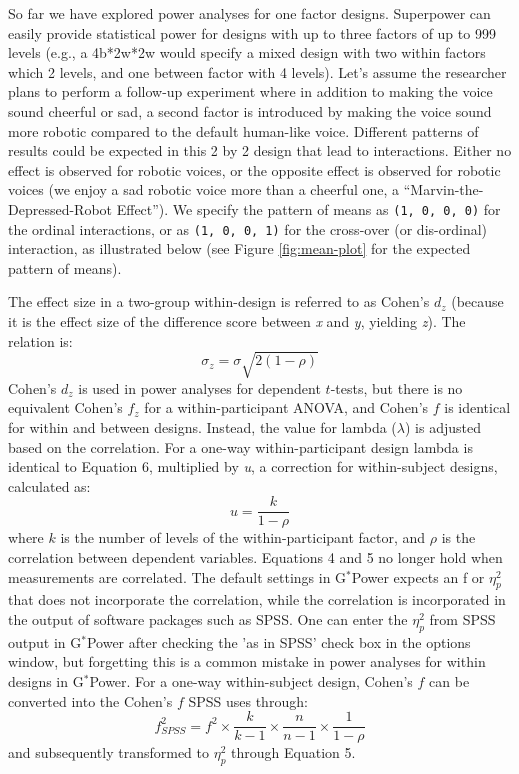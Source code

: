 \documentclass[
  ,jou,floatsintext]{apa6}
\begin{document}
So far we have explored power analyses for one factor designs.
Superpower can easily provide statistical power for designs with up to three factors of up to 999 levels (e.g., a 4b*2w*2w would specify a mixed design with two within factors which 2 levels, and one between factor with 4 levels).
Let's assume the researcher plans to perform a follow-up experiment where in addition to making the voice sound cheerful or sad, a second factor is introduced by making the voice sound more robotic compared to the default human-like voice.
Different patterns of results could be expected in this 2 by 2 design that lead to interactions.
Either no effect is observed for robotic voices, or the opposite effect is observed for robotic voices (we enjoy a sad robotic voice more than a cheerful one, a \enquote{Marvin-the-Depressed-Robot Effect}).
We specify the pattern of means as \texttt{(1,\ 0,\ 0,\ 0)} for the ordinal interactions, or as \texttt{(1,\ 0,\ 0,\ 1)} for the cross-over (or dis-ordinal) interaction, as illustrated below (see Figure \ref{fig:mean-plot} for the expected pattern of means).

\begin{tcolorbox}[colback=black!5!white,colframe=white!5!black,title=Box 2. Formula for effect sizes for within designs]
The effect size in a two-group within-design is referred to as Cohen's $d_z$ (because it is the effect size of the difference score between \emph{x} and \emph{y}, yielding \emph{z}). The relation is:
\begin{equation}
\sigma_{z}=\sigma\sqrt{2(1-\rho)}
\end{equation}
Cohen's $d_z$ is used in power analyses for dependent $t$-tests, but there is no equivalent Cohen's $f_z$ for a within-participant ANOVA, and Cohen's $f$ is identical for within and between designs. 
Instead, the value for lambda ($\lambda$) is adjusted based on the correlation. 
For a one-way within-participant design lambda is identical to Equation 6, multiplied by \textit{u}, a correction for within-subject designs, calculated as:
\begin{equation}
u = \frac{k}{1-\rho}
\end{equation}
where $k$ is the number of levels of the within-participant factor, and $\rho$ is the correlation between dependent variables.
Equations 4 and 5 no longer hold when measurements are correlated.
The default settings in G$^{*}$Power expects an f or $\eta_p^2$ that does not incorporate the correlation, while the correlation is incorporated in the output of software packages such as SPSS. 
One can  enter the $\eta_p^2$ from SPSS output in G$^{*}$Power after checking the 'as in SPSS' check box in the options window, but forgetting this is a common mistake in power analyses for within designs in G$^{*}$Power.
For a one-way within-subject design, Cohen's $f$ can be converted into the Cohen's $f$ SPSS uses through:
\begin{equation}
f^2_{SPSS} = f^2 \times \frac{k}{k-1} \times \frac{n}{n-1} \times \frac{1}{1-\rho}
\end{equation}
and subsequently transformed to $\eta_p^2$ through Equation 5.
\end{tcolorbox}
\end{document}
